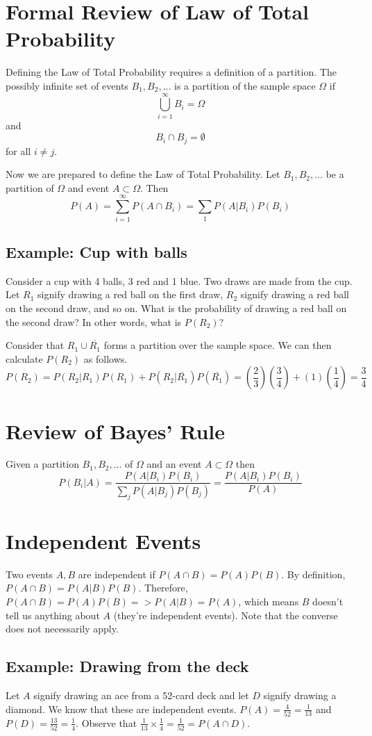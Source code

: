 \documentclass[10pt]{article}
\begin{document}
\section*{Formal Review of Law of Total Probability}
Defining the Law of Total Probability requires a definition of a partition. The possibly infinite set of events $B_1, B_2, ...$ is a partition of the sample space $\Omega$ if \[ \bigcup_{i=1}^{\infty}B_i = \Omega \] and \[ B_i \cap B_j = \emptyset \] for all $i \neq j$.

Now we are prepared to define the Law of Total Probability. Let $B_1, B_2,...$ be a partition of $\Omega$ and event $A \subset \Omega$. Then \[ P(A) = \sum_{i=1}^{\infty}P(A \cap B_i) = \sum_{1}P(A|B_i)P(B_i) \]

\subsection*{Example: Cup with balls}
Consider a cup with 4 balls, 3 red and 1 blue. Two draws are made from the cup. Let $R_1$ signify drawing a red ball on the first draw, $R_2$ signify drawing a red ball on the second draw, and so on. What is the probability of drawing a red ball on the second draw? In other words, what is $P(R_2)$?

Consider that $R_1 \cup \overline{R_1}$ forms a partition over the sample space. We can then calculate $P(R_2)$ as follows.
\[ P(R_2) = P(R_2|R_1)P(R_1) + P(R_2|\overline{R_1})P(\overline{R_1}) = (\frac{2}{3})(\frac{3}{4}) + (1)(\frac{1}{4}) = \frac{3}{4} \]

\section*{Review of Bayes' Rule}
Given a partition $B_1, B_2,...$ of $\Omega$ and an event $A \subset \Omega$ then \[ P(B_i|A) = \frac{P(A|B_i)P(B_i)}{\sum_jP(A|B_j)P(B_j)} = \frac{P(A|B_i)P(B_i)}{P(A)}  \]

\section*{Independent Events}
Two events $A, B$ are independent if $P(A \cap B) = P(A)P(B)$. By definition, $P(A \cap B) = P(A|B)P(B)$. Therefore, $P(A \cap B) = P(A)P(B) => P(A|B) = P(A)$, which means $B$ doesn't tell us anything about $A$ (they're independent events). Note that the converse does not necessarily apply.

\subsection*{Example: Drawing from the deck}
Let $A$ signify drawing an ace from a 52-card deck and let $D$ signify drawing a diamond. We know that these are independent events. $P(A) = \frac{4}{52} = \frac{1}{13}$ and $P(D)=\frac{13}{52} = \frac{1}{4}$. Observe that $\frac{1}{13} \times \frac{1}{4} = \frac{1}{52} = P(A \cap D)$.
\end{document}
